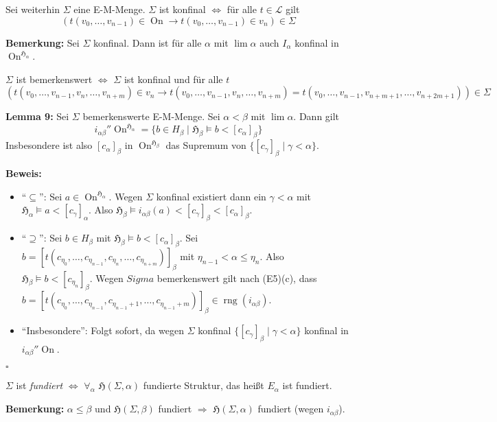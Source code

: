 \documentclass[a4paper,fontsize=11pt]{scrartcl}
\newcommand{\rng}{\operatorname{rng}}
\newcommand{\On}{\operatorname{On}}
\begin{document}
Sei weiterhin $\Sigma$ eine E-M-Menge. $\Sigma$ ist konfinal
$\Leftrightarrow$ für alle $t\in\mathcal{L}$ gilt
$$(t(v_0,\ldots,v_{n-1})\in\On\rightarrow t(v_0,\ldots,v_{n-1})\in
v_n)\in\Sigma$$

{\bf Bemerkung:} Sei $\Sigma$ konfinal. Dann ist für alle $\alpha$ mit
$\lim \alpha$ auch $I_\alpha$ konfinal in $\On^{\mathfrak{H}_\alpha}$.


$\Sigma$ ist bemerkenswert $\Leftrightarrow$ $\Sigma$ ist konfinal und
für alle $t$ $$(t(v_0,\ldots,v_{n-1},v_n,\ldots,v_{n+m})\in v_n
\rightarrow
t(v_0,\ldots,v_{n-1},v_n,\ldots,v_{n+m})=t(v_0,\ldots,v_{n-1},v_{n+m+1},\ldots,v_{n+2m+1}))\in\Sigma$$

{\bf Lemma 9:} Sei $\Sigma$ bemerkenswerte E-M-Menge. Sei $\alpha<\beta$ mit $\lim \alpha$. Dann gilt
$$i_{\alpha\beta}''\On^{\mathfrak{H}_\alpha}=\{b\in
H_\beta\mid\mathfrak{H}_\beta\models b<[c_\alpha]_\beta\}$$ Insbesondere
ist also $[c_\alpha]_\beta$ in $\On^{\mathfrak{H}_\beta}$ das Supremum
von $\{[c_\gamma]_\beta\mid\gamma<\alpha\}$.

{\bf Beweis:}
\begin{itemize}
  \item ``$\subseteq$'': Sei $a\in\On^{\mathfrak{H}_\alpha}$. Wegen
    $\Sigma$ konfinal existiert dann ein $\gamma<\alpha$ mit
    $\mathfrak{H}_\alpha\models a<[c_\gamma]_\alpha$. Also
    $\mathfrak{H}_\beta\models
    i_{\alpha\beta}(a)<[c_\gamma]_\beta<[c_\alpha]_\beta$.
  \item ``$\supseteq$'': Sei $b\in H_\beta$ mit
    $\mathfrak{H}_\beta\models b<[c_\alpha]_\beta$. Sei
    $b=[t(c_{\eta_0},\ldots,c_{\eta_{n-1}},c_{\eta_n},\ldots,c_{\eta_{n+m}})]_\beta$
    mit $\eta_{n-1}<\alpha\le\eta_n$. Also $\mathfrak{H}_\beta\models
    b<[c_{\eta_n}]_\beta$. Wegen $Sigma$ bemerkenswert gilt nach
    (E5)(c), dass
    $b=[t(c_{\eta_0},\ldots,c_{\eta_{n-1}},c_{\eta_{n-1}+1},\ldots,c_{\eta_{n-1}+m})]_\beta\in\rng
    (i_{\alpha\beta})$.
  \item ``Insbesondere'': Folgt sofort, da wegen $\Sigma$ konfinal
    $\{[c_\gamma]_\beta\mid\gamma<\alpha\}$ konfinal in
    $i_{\alpha\beta}''\On$.
\end{itemize}
\hfill $\square$

$\Sigma$ ist {\it fundiert} $\Leftrightarrow$ $\forall_\alpha$
$\mathfrak{H}(\Sigma,\alpha)$ fundierte Struktur, das heißt $E_\alpha$
ist fundiert.

{\bf Bemerkung:} $\alpha\le\beta$ und $\mathfrak{H}(\Sigma,\beta)$
fundiert $\Rightarrow$ $\mathfrak{H}(\Sigma,\alpha)$ fundiert (wegen
$i_{\alpha\beta}$).
\end{document}
